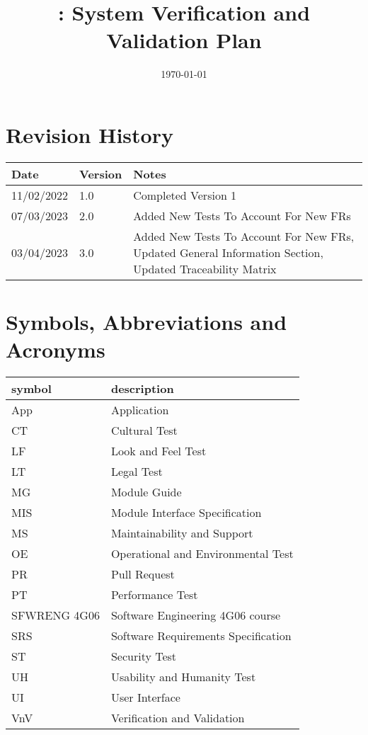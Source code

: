 \documentclass[12pt, titlepage]{article}
\begin{document}
	
	\title{\progname{}: System Verification and Validation Plan} 
	\author{\authname}
	\date{\today}
	
	\maketitle
	
	
	\section{Revision History}
	
	\begin{tabularx}{\textwidth}{p{3cm}p{2cm}X}
		\toprule {\bf Date} & {\bf Version} & {\bf Notes}\\
		\midrule
		11/02/2022 & 1.0 & Completed Version 1\\
		07/03/2023 & 2.0 & Added New Tests To Account For New FRs\\
		03/04/2023 & 3.0 & Added New Tests To Account For New FRs, Updated General Information Section, Updated Traceability Matrix\\
		\bottomrule
	\end{tabularx}
	
	\newpage
	
	\tableofcontents
	
	\listoftables
	
	\newpage
	
	\section{Symbols, Abbreviations and Acronyms}
	
	\renewcommand{\arraystretch}{1.2}
	\begin{tabular}{l l} 
		\toprule		
		\textbf{symbol} & \textbf{description}\\
		\midrule 
		App & Application\\
		CT & Cultural Test\\
		LF & Look and Feel Test\\
		LT & Legal Test\\
		MG & Module Guide\\
		MIS & Module Interface Specification\\
		MS & Maintainability and Support\\
		OE & Operational and Environmental Test\\
		PR& Pull Request\\
		PT& Performance Test\\
		SFWRENG 4G06& Software Engineering 4G06 course\\
		SRS & Software Requirements Specification\\
		ST & Security Test\\
		UH & Usability and Humanity Test\\
		UI & User Interface\\
		VnV & Verification and Validation\\
		\bottomrule
	\end{tabular}\\
	
\end{document}
